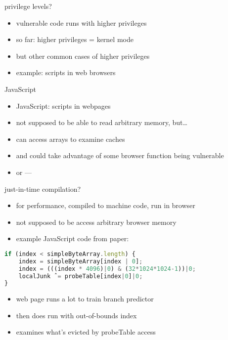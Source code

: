 \begin{frame}{privilege levels?}
    \begin{itemize}
    \item vulnerable code runs with higher privileges
    \item so far: higher privileges = kernel mode
    \vspace{.5cm}
    \item but other common cases of higher privileges
    \item example: scripts in web browsers
    \end{itemize}
\end{frame}

\begin{frame}[fragile]{JavaScript}
\begin{itemize}
\item JavaScript: scripts in webpages
\item not supposed to be able to read arbitrary memory, but\ldots
\item can access arrays to examine caches
\item and could take advantage of some browser function being vulnerable
\vspace{.5cm}
\item<2-> or --- 
\end{itemize}
\end{frame}

\begin{frame}[fragile]{just-in-time compilation?}
\begin{itemize}
\item for performance, compiled to machine code, run in browser
\item not supposed to be access arbitrary browser memory
\item example JavaScript code from paper:
\end{itemize}
\begin{lstlisting}[language=JavaScript,style=small]
if (index < simpleByteArray.length) {
    index = simpleByteArray[index | 0];
    index = (((index * 4096)|0) & (32*1024*1024-1))|0;
    localJunk ˆ= probeTable[index|0]|0;
}
\end{lstlisting}
\begin{itemize}
\item web page runs a lot to train branch predictor
\item then does run with out-of-bounds index
\item examines what's evicted by probeTable access
\end{itemize}
\end{frame}
